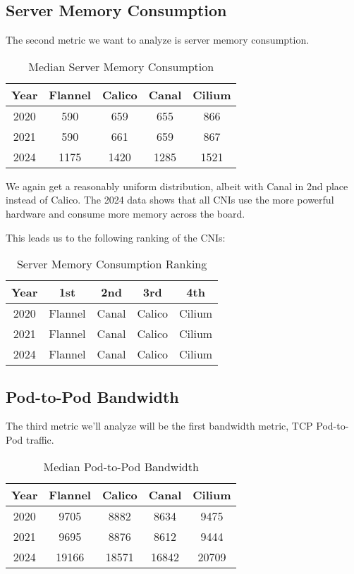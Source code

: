 \subsection{Server Memory Consumption}

The second metric we want to analyze is server memory consumption.

\begin{table}[H]
\caption{Median Server Memory Consumption}
\begin{tabular}{|c | c | c | c | c|} 
 \hline
 Year & Flannel & Calico & Canal & Cilium \\
 \hline\hline
 2020 & 590 & 659 & 655 & 866 \\ 
 \hline
 2021 & 590 & 661 & 659 & 867 \\
 \hline
 2024 & 1175 & 1420 & 1285 & 1521 \\
 \hline
\end{tabular}
\label{tab:mem}
\end{table}

We again get a reasonably uniform distribution, albeit with Canal in 2nd place instead of Calico. The 2024 data shows that all CNIs use the more powerful hardware and consume more memory across the board.

This leads us to the following ranking of the CNIs:

\begin{table}[H]
\caption{Server Memory Consumption Ranking}
\begin{tabular}{|c | c | c | c | c|} 
 \hline
 Year & 1st & 2nd & 3rd & 4th \\
 \hline\hline
 2020 & Flannel & Canal & Calico & Cilium \\ 
 \hline
 2021 & Flannel & Canal & Calico & Cilium \\
 \hline
 2024 & Flannel & Canal & Calico & Cilium \\
 \hline
\end{tabular}
\label{tab:mem-r}
\end{table}

\subsection{Pod-to-Pod Bandwidth}

The third metric we'll analyze will be the first bandwidth metric, TCP Pod-to-Pod traffic.

\begin{table}[H]
\caption{Median Pod-to-Pod Bandwidth}
\begin{tabular}{|c | c | c | c | c|} 
 \hline
 Year & Flannel & Calico & Canal & Cilium \\
 \hline\hline
 2020 & 9705 & 8882 & 8634 & 9475 \\ 
 \hline
 2021 & 9695 & 8876 & 8612 & 9444 \\
 \hline
 2024 & 19166 & 18571 & 16842 & 20709 \\
 \hline
\end{tabular}
\label{tab:p2pbw}
\end{table}

